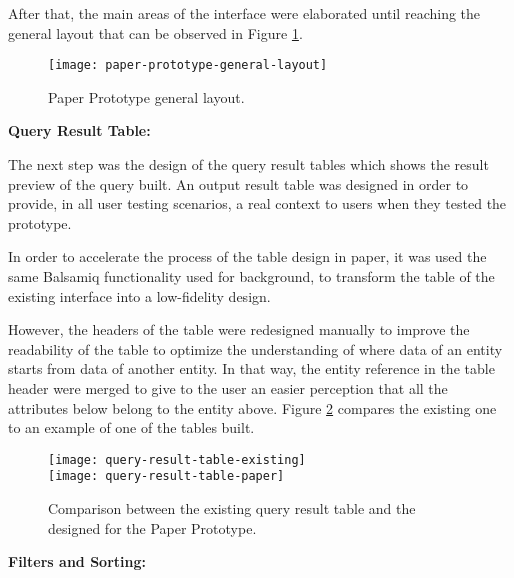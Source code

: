 After that, the main areas of the interface were elaborated until reaching the general layout that can be observed in Figure \ref{fig:paperPrototypeGeneralLayout}.

\begin{figure}[htbp]
	\centering
	\texttt{[image: paper-prototype-general-layout]}
	\caption{Paper Prototype general layout.}
	\label{fig:paperPrototypeGeneralLayout}
\end{figure}

\medskip

\textbf{Query Result Table:}

\medskip

The next step was the design of the query result tables which shows the result preview of the query built. An output result table was designed in order to provide, in all user testing scenarios, a real context to users when they tested the prototype.

In order to accelerate the process of the table design in paper, it was used the same Balsamiq functionality used for background, to transform the table of the existing interface into a low-fidelity design.

However, the headers of the table were redesigned manually to improve the readability of the table to optimize the understanding of where data of an entity starts from data of another entity. In that way, the entity reference in the table header were merged to give to the user an easier perception that all the attributes below belong to the entity above. Figure \ref{fig:queryResultTableComparison} compares the existing one to an example of one of the tables built.

\begin{figure}[tb]
  \centering
    {\texttt{[image: query-result-table-existing]}}%
    \\
  {\texttt{[image: query-result-table-paper]}}%
\caption{Comparison between the existing query result table and the designed for the Paper Prototype.}
  \label{fig:queryResultTableComparison}
\end{figure}

\medskip

\textbf{Filters and Sorting: }

\medskip

